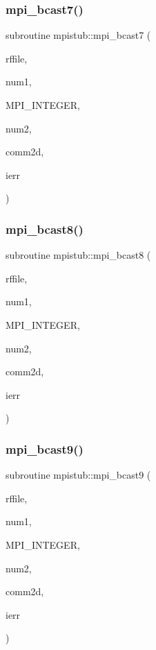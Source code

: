 \mbox{\label{namespacempistub_a5557aded89a597293b1fda3138bce902}} 
\subsubsection{\texorpdfstring{mpi\_bcast7()}{mpi\_bcast7()}}
{\footnotesize\ttfamily subroutine mpistub\+::mpi\+\_\+bcast7 (\begin{DoxyParamCaption}\item[{double complex, dimension(\+:,\+:,\+:)}]{rffile,  }\item[{}]{num1,  }\item[{}]{M\+P\+I\+\_\+\+I\+N\+T\+E\+G\+ER,  }\item[{}]{num2,  }\item[{integer}]{comm2d,  }\item[{}]{ierr }\end{DoxyParamCaption})}

\mbox{\label{namespacempistub_a8a78645877ad94bcd0dbb6240b20f15a}} 
\subsubsection{\texorpdfstring{mpi\_bcast8()}{mpi\_bcast8()}}
{\footnotesize\ttfamily subroutine mpistub\+::mpi\+\_\+bcast8 (\begin{DoxyParamCaption}\item[{double complex, dimension(\+:,\+:)}]{rffile,  }\item[{}]{num1,  }\item[{}]{M\+P\+I\+\_\+\+I\+N\+T\+E\+G\+ER,  }\item[{}]{num2,  }\item[{integer}]{comm2d,  }\item[{}]{ierr }\end{DoxyParamCaption})}

\mbox{\label{namespacempistub_ab1b85417ae697305c4b8ede7fa7d5f26}} 
\subsubsection{\texorpdfstring{mpi\_bcast9()}{mpi\_bcast9()}}
{\footnotesize\ttfamily subroutine mpistub\+::mpi\+\_\+bcast9 (\begin{DoxyParamCaption}\item[{double complex, dimension(\+:)}]{rffile,  }\item[{}]{num1,  }\item[{}]{M\+P\+I\+\_\+\+I\+N\+T\+E\+G\+ER,  }\item[{}]{num2,  }\item[{integer}]{comm2d,  }\item[{}]{ierr }\end{DoxyParamCaption})}

